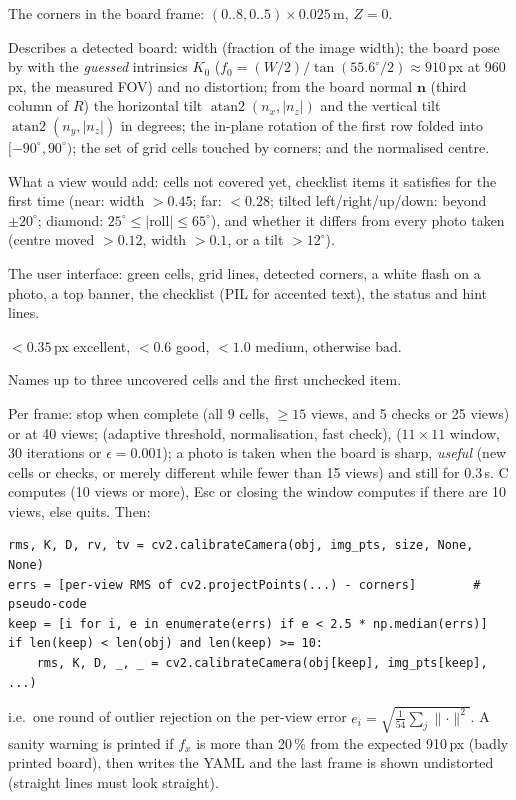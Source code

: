 The corners in the board frame: $(0..8, 0..5) \times 0.025$\,m, $Z=0$.

Describes a detected board: width (fraction of the image width); the board pose by  with the
\emph{guessed} intrinsics $K_0$ ($f_0 = (W/2)/\tan(55.6^\circ/2) \approx 910$\,px at 960\,px, the measured FOV) and
no distortion; from the board normal $\mathbf n$ (third column of $R$) the horizontal tilt
$\operatorname{atan2}(n_x, |n_z|)$ and the vertical tilt $\operatorname{atan2}(n_y, |n_z|)$ in degrees; the in-plane
rotation of the first row folded into $[-90^\circ, 90^\circ)$; the set of grid cells touched by corners; and the
normalised centre.

What a view would add: cells not covered yet, checklist items it satisfies for the first time (near: width
$> 0.45$; far: $< 0.28$; tilted left/right/up/down: beyond $\pm 20^\circ$; diamond: $25^\circ \le |\text{roll}| \le 65^\circ$),
and whether it differs from every photo taken (centre moved $> 0.12$, width $> 0.1$, or a tilt $> 12^\circ$).

The user interface: green cells, grid lines, detected corners, a white flash on a photo, a top banner, the
checklist (PIL for accented text), the status and hint lines.

$< 0.35$\,px excellent, $< 0.6$ good, $< 1.0$ medium, otherwise bad.

Names up to three uncovered cells and the first unchecked item.

Per frame: stop when complete (all 9 cells, $\ge 15$ views, and 5 checks or 25 views) or at 40 views;
 (adaptive threshold, normalisation, fast check),  ($11\times11$
window, 30 iterations or $\epsilon = 0.001$); a photo is taken when the board is sharp, \emph{useful} (new cells or
checks, or merely different while fewer than 15 views) and still for 0.3\,s. C computes (10 views or more), Esc or
closing the window computes if there are 10 views, else quits. Then:
\begin{lstlisting}
rms, K, D, rv, tv = cv2.calibrateCamera(obj, img_pts, size, None, None)
errs = [per-view RMS of cv2.projectPoints(...) - corners]        # pseudo-code
keep = [i for i, e in enumerate(errs) if e < 2.5 * np.median(errs)]
if len(keep) < len(obj) and len(keep) >= 10:
    rms, K, D, _, _ = cv2.calibrateCamera(obj[keep], img_pts[keep], ...)
\end{lstlisting}
i.e.\ one round of outlier rejection on the per-view error $e_i = \sqrt{\tfrac{1}{54}\sum_j \lVert\cdot\rVert^2}$.
A sanity warning is printed if $f_x$ is more than 20\,\% from the expected 910\,px (badly printed board), then
 writes the YAML and the last frame is shown undistorted (straight lines must look straight).


